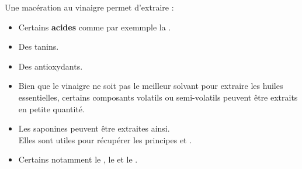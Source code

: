 \begin{Remarque}
    Une macération au vinaigre permet d'extraire :
	\begin{multicols}{2}
        \begin{itemize}[label = \faPen]
		\item Certains \textbf{acides} comme par exemmple la .
		\item Des tanins.
		\item Des antioxydants.
		\item Bien que le vinaigre ne soit pas le meilleur solvant pour extraire les huiles essentielles, certains composants volatils ou semi-volatils peuvent être extraits en petite quantité.
		\item Les saponines peuvent être extraites ainsi.\\ Elles sont utiles pour récupérer les principes  et .
		\item Certains  notamment le , le  et le .
        \end{itemize}
    \end{multicols}
\end{Remarque}